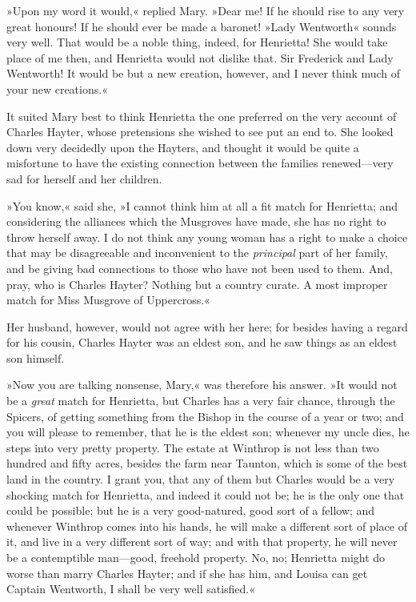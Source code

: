 »Upon my word it would,« replied Mary. »Dear me! If he should rise to any very great honours! If he should ever be made a baronet! »Lady Wentworth« sounds very well. That would be a noble thing, indeed, for Henrietta! She would take place of me then, and Henrietta would not dislike that. Sir Frederick and Lady Wentworth! It would be but a new creation, however, and I never think much of your new creations.«

It suited Mary best to think Henrietta the one preferred on the very account of Charles Hayter, whose pretensions she wished to see put an end to. She looked down very decidedly upon the Hayters, and thought it would be quite a misfortune to have the existing connection between the families renewed—very sad for herself and her children.

»You know,« said she, »I cannot think him at all a fit match for Henrietta; and considering the alliances which the Musgroves have made, she has no right to throw herself away. I do not think any young woman has a right to make a choice that may be disagreeable and inconvenient to the \textit{principal} part of her family, and be giving bad connections to those who have not been used to them. And, pray, who is Charles Hayter? Nothing but a country curate. A most improper match for Miss Musgrove of Uppercross.«

Her husband, however, would not agree with her here; for besides having a regard for his cousin, Charles Hayter was an eldest son, and he saw things as an eldest son himself.

»Now you are talking nonsense, Mary,« was therefore his answer. »It would not be a \textit{great} match for Henrietta, but Charles has a very fair chance, through the Spicers, of getting something from the Bishop in the course of a year or two; and you will please to remember, that he is the eldest son; whenever my uncle dies, he steps into very pretty property. The estate at Winthrop is not less than two hundred and fifty acres, besides the farm near Taunton, which is some of the best land in the country. I grant you, that any of them but Charles would be a very shocking match for Henrietta, and indeed it could not be; he is the only one that could be possible; but he is a very good-natured, good sort of a fellow; and whenever Winthrop comes into his hands, he will make a different sort of place of it, and live in a very different sort of way; and with that property, he will never be a contemptible man—good, freehold property. No, no; Henrietta might do worse than marry Charles Hayter; and if she has him, and Louisa can get Captain Wentworth, I shall be very well satisfied.«

